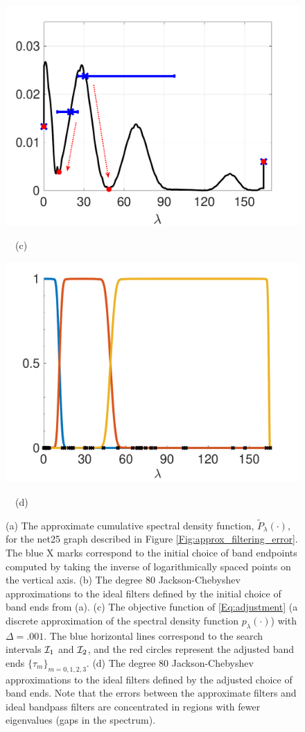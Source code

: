 \documentclass[journal, 10pt]{IEEEtran}
\begin{document}
\begin{figure}[tb]
\begin{minipage}[m]{0.49\linewidth}
\centerline{\includegraphics[width=1.1\linewidth]{fig_pdf}}
\centerline{~~\small{(c)}}
\end{minipage}
\begin{minipage}[m]{0.49\linewidth}
\centerline{\includegraphics[width=1.1\linewidth]{fig_updated_fb}}
\centerline{~~\small{(d)}}
\end{minipage}
\caption{{(a) The approximate cumulative spectral density function, $\tilde{P}_{\lambda}(\cdot),$ for the net25 graph described in Figure \ref{Fig:approx_filtering_error}. The blue X marks correspond to the initial choice of band endpoints computed by taking the inverse of logarithmically spaced points on the vertical axis. (b) The degree 80 Jackson-Chebyshev approximations to the ideal filters defined by the initial choice of band ends from (a). (c) The objective function of \eqref{Eq:adjustment} (a discrete approximation of the spectral density function $p_{\lambda}(\cdot)$) with $\Delta=.001$. The blue horizontal lines correspond to the search intervals ${\cal I}_1$ and ${\cal I}_2$, and the red circles represent the adjusted band ends $\{\tau_m\}_{m=0,1,2,3}$. (d) The degree 80 Jackson-Chebyshev approximations to the ideal filters defined by the adjusted choice of band ends. Note that the errors between the approximate filters and ideal bandpass filters are concentrated in regions with fewer eigenvalues (gaps in the spectrum).}}\label{Fig:fb_design}

\end{figure}
\end{document}

